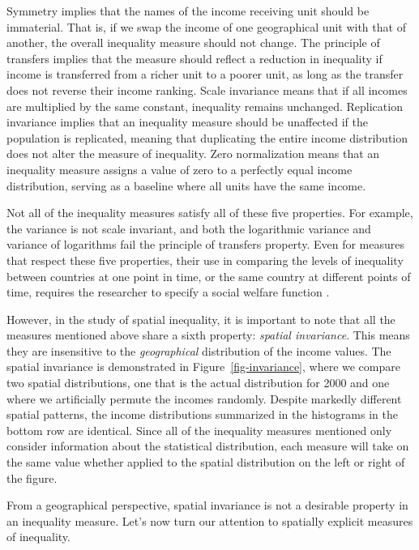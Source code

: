 \documentclass[
  a4paper, 
  twoside,
  final
]{article}
\begin{document}
Symmetry implies that the names of the income receiving unit should be
immaterial. That is, if we swap the income of one geographical unit with
that of another, the overall inequality measure should not change. The
principle of transfers implies that the measure should reflect a
reduction in inequality if income is transferred from a richer unit to a
poorer unit, as long as the transfer does not reverse their income
ranking. Scale invariance means that if all incomes are multiplied by
the same constant, inequality remains unchanged. Replication invariance
implies that an inequality measure should be unaffected if the
population is replicated, meaning that duplicating the entire income
distribution does not alter the measure of inequality. Zero
normalization means that an inequality measure assigns a value of zero
to a perfectly equal income distribution, serving as a baseline where
all units have the same income.

Not all of the inequality measures satisfy all of these five properties.
For example, the variance is not scale invariant, and both the
logarithmic variance and variance of logarithms fail the principle of
transfers property. Even for measures that respect these five
properties, their use in comparing the levels of inequality between
countries at one point in time, or the same country at different points
of time, requires the researcher to specify a social welfare function
\citep{atkinson1970MeasurementInequality}.

However, in the study of spatial inequality, it is important to note
that all the measures mentioned above share a sixth property:
\emph{spatial invariance}. This means they are insensitive to the
\emph{geographical} distribution of the income values. The spatial
invariance is demonstrated in Figure~\ref{fig-invariance}, where we
compare two spatial distributions, one that is the actual distribution
for 2000 and one where we artificially permute the incomes randomly.
Despite markedly different spatial patterns, the income distributions
summarized in the histograms in the bottom row are identical. Since all
of the inequality measures mentioned only consider information about the
statistical distribution, each measure will take on the same value
whether applied to the spatial distribution on the left or right of the
figure.

From a geographical perspective, spatial invariance is not a desirable
property in an inequality measure. Let's now turn our attention to
spatially explicit measures of inequality.
\end{document}
